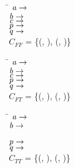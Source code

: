 \begin{subfigure}[t]{\textwidth}
  \begin{tabbing}
    \qquad \quad \= $\mathit{a}{} \rightarrow$ \tru{} \\
    \> $\mathit{b}{} \rightarrow$ \fls{} \\
    \> $\mathit{c}{} \rightarrow$ \tru{} \\
    \> $\mathit{p}{} \rightarrow$ \tru{} \\
    \> $\mathit{q}{} \rightarrow$ \fls{} \\
    \quad $C_{FF}$ = \{(\AV{}, \fls{}), (\BV{}, \fls{})\} \\
  \end{tabbing}
\end{subfigure}%
\begin{subfigure}[t]{\textwidth}
  \begin{tabbing}
    \qquad \quad \= $\mathit{a}{} \rightarrow$ \tru{} \\
    \> $\mathit{b}{} \rightarrow$ \fls{} \\
    \> $\mathit{c}{} \rightarrow$ \tru{} \\
    \> $\mathit{p}{} \rightarrow$ \tru{} \\
    \> $\mathit{q}{} \rightarrow$ \fls{} \\
    \quad $C_{FT}$ = \{(\AV{}, \fls{}), (\BV{}, \tru{})\} \\
  \end{tabbing}
\end{subfigure}%
\begin{subfigure}[t]{\textwidth}
  \begin{tabbing}
    \qquad \quad \= $\mathit{a}{} \rightarrow$ \tru{} \\
    \> $\mathit{b}{} \rightarrow$ \fls{} \\
    \\
    \> $\mathit{p}{} \rightarrow$ \fls{} \\
    \> $\mathit{q}{} \rightarrow$ \tru{} \\
    \quad $C_{TT}$ = \{(\AV{}, \tru{}), (\BV{}, \tru{})\} \\
  \end{tabbing}
\end{subfigure}%